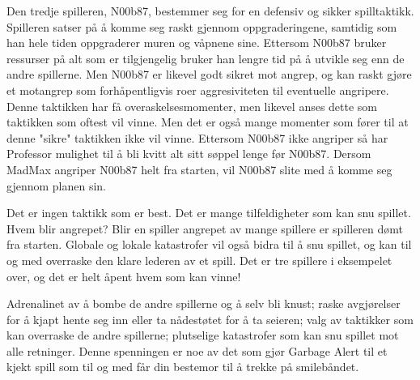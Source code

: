Den tredje spilleren, N00b87, bestemmer seg for en defensiv og sikker spilltaktikk. Spilleren satser på å komme seg raskt gjennom oppgraderingene, samtidig som han hele tiden oppgraderer muren og våpnene sine. Ettersom N00b87 bruker ressurser på alt som er tilgjengelig bruker han lengre tid på å utvikle seg enn de andre spillerne. Men N00b87 er likevel godt sikret mot angrep, og kan raskt gjøre et motangrep som forhåpentligvis roer aggresiviteten til eventuelle angripere. Denne taktikken har få overaskelsesmomenter, men likevel anses dette som taktikken som oftest vil vinne. Men det er også mange momenter som fører til at denne "sikre" taktikken ikke vil vinne. Ettersom N00b87 ikke angriper så har Professor mulighet til å bli kvitt alt sitt søppel lenge før N00b87. Dersom MadMax angriper N00b87 helt fra starten, vil N00b87 slite med å komme seg gjennom planen sin. 

Det er ingen taktikk som er best. Det er mange tilfeldigheter som kan snu spillet. Hvem blir angrepet? Blir en spiller angrepet av mange spillere er spilleren dømt fra starten. Globale og lokale katastrofer vil også bidra til å snu spillet, og kan til og med overraske den klare lederen av et spill. Det er tre spillere i eksempelet over, og det er helt åpent hvem som kan vinne!

Adrenalinet av å bombe de andre spillerne og å selv bli knust; raske avgjørelser for å kjapt hente seg inn eller ta nådestøtet for å ta seieren; valg av taktikker som kan overraske de andre spillerne; plutselige katastrofer som kan snu spillet mot alle retninger. Denne spenningen er noe av det som gjør Garbage Alert til et kjekt spill som til og med får din bestemor til å trekke på smilebåndet.


